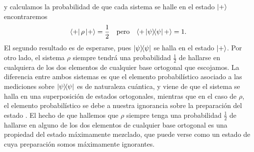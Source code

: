 y calculamos la probabilidad de que cada sistema se halle en el estado $\ket{+}$ encontraremos
\begin{align*}
    \bra{+}\rho\ket{+}=\frac{1}{2} && \text{pero} &&\langle + \dyad{\psi} +\rangle=1\rlap{.}
\end{align*}
El segundo resultado es de esperarse, pues $\dyad{\psi}$ se halla en el estado $\ket{+}$. Por otro lado, el sistema $\rho$ siempre tendrá una probabilidad $\frac{1}{2}$ de hallarse en cualquiera de los dos elementos de cualquier base ortogonal que escojamos. La diferencia entre ambos sistemas es que el elemento probabilístico asociado a las mediciones sobre $\dyad{\psi}$ es de naturaleza cuántica, y viene de que el sistema se halla en una superposición de estados ortogonales, mientras que en el caso de $\rho$, el elemento probabilístico se debe a nuestra ignorancia sobre la preparación del estado \cite{Chuang}. El hecho de que hallemos que $\rho$ siempre tenga una probabilidad $\frac{1}{2}$ de hallarse en alguno de los dos elementos de cualquier base ortogonal es una propiedad del estado máximamente mezclado, que puede verse como un estado de cuya preparación somos máximamente ignorantes.



